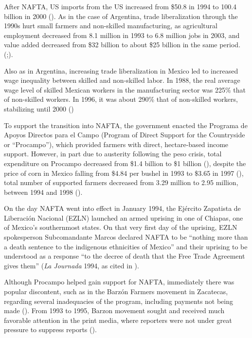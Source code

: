 \documentclass[12pt]{report}
\begin{document}
After NAFTA, US imports from the US increased from \$50.8 in 1994 to 100.4 billion in 2000
(\citealt[10]{Villareal:2010vk}). As in the case of Argentina, trade liberalization through the
1990s hurt small farmers and non-skilled manufacturing, as agricultural employment decreased from
8.1 million in 1993 to 6.8 million jobs in 2003, and value added decreased from \$32 billion to
about \$25 billion in the same period.
(\citealt[289]{Hufbauer:2005vh};\citealt[14]{Villareal:2010vk}).

Also as in Argentina, increasing trade liberalization in Mexico led to increased wage inequality
between skilled and non-skilled labor. In 1988, the real average wage level of skilled Mexican
workers in the manufacturing sector was 225\% that of non-skilled workers. In 1996, it was about
290\% that of non-skilled workers, stabilizing until 2000 (\citealt[9]{Villareal:2010vk})

To support the transition into NAFTA, the government enacted the Programa de Apoyos Directos para el
Campo (Program of Direct Support for the Countryside or ``Procampo''), which provided farmers with
direct, hectare-based income support. However, in part due to austerity following the peso crisis,
total expenditure on Procampo decreased from \$1.4 billion to \$1 billion
(\citealt[295]{Hufbauer:2005vh}), despite the price of corn in Mexico falling from \$4.84 per bushel
in 1993 to \$3.65 in 1997 (\citealt[12]{Villareal:2010vk}), total number of supported farmers
decreased from 3.29 million to 2.95 million, between 1994 and 1998 (\citealt[295]{Hufbauer:2005vh}).

On the day NAFTA went into effect in January 1994, the Ejército Zapatista de Liberación Nacional
(EZLN) launched an armed uprising in one of Chiapas, one of Mexico's southernmost states. On that
very first day of the uprising, EZLN spokesperson Subcomandante Marcos declared NAFTA to be
``nothing more than a death sentence to the indigenous ethnicities of Mexico'' and their uprising to
be understood as a response ``to the decree of death that the Free Trade Agreement gives them''
(\emph{La Journada }1994, as cited in \citealt[216]{Hayden:2009uy}).

Although Procampo helped gain support for NAFTA, immediately there was popular discontent, such as
in the Barzón Farmers movement in Zacatecas, regarding several inadequacies of the program,
including payments not being made (\citealt[173]{Williams:2001ux}). From 1993 to 1995, Barzon
movement sought and received much favorable attention in the print media, where reporters were not
under great pressure to suppress reports (\citealt[187]{Williams:2001ux}).
\end{document}

